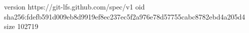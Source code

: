 version https://git-lfs.github.com/spec/v1
oid sha256:fdefb591d009eb8d9919ef8ec237ec5f2a976e78d57755cabc8782ebd4a205d4
size 102719
